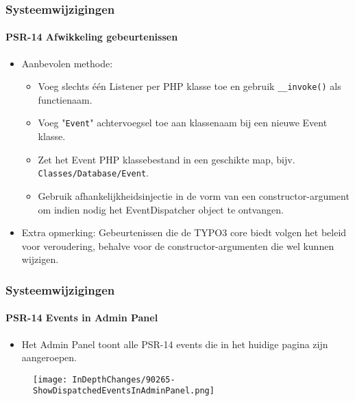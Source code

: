 
\begin{frame}[fragile]
	\frametitle{Systeemwijzigingen}
	\framesubtitle{PSR-14 Afwikkeling gebeurtenissen}

	\lstset{basicstyle=\tiny\ttfamily}

	\begin{itemize}
		\item Aanbevolen methode:

			\begin{itemize}
				\item Voeg slechts één Listener per PHP klasse toe en gebruik \texttt{\_\_invoke()} als functienaam.
				\item Voeg "\texttt{Event}" achtervoegsel toe aan klassenaam bij een nieuwe Event klasse.
				\item Zet het Event PHP klassebestand in een geschikte map, bijv. \texttt{Classes/Database/Event}.
				\item Gebruik afhankelijkheidsinjectie in de vorm van een constructor-argument om indien nodig
					het EventDispatcher object te ontvangen.
			\end{itemize}

		\item Extra opmerking:\newline
			\small
				Gebeurtenissen die de TYPO3 core biedt volgen het beleid voor veroudering, behalve voor de constructor-argumenten
				die wel kunnen wijzigen.
			\normalsize

	\end{itemize}

\end{frame}


\begin{frame}[fragile]
	\frametitle{Systeemwijzigingen}
	\framesubtitle{PSR-14 Events in Admin Panel}

	\begin{itemize}
		\item Het Admin Panel toont alle PSR-14 events die in het huidige pagina zijn aangeroepen.
	\end{itemize}

	\begin{figure}
		\texttt{[image: InDepthChanges/90265-ShowDispatchedEventsInAdminPanel.png]}
	\end{figure}

\end{frame}

